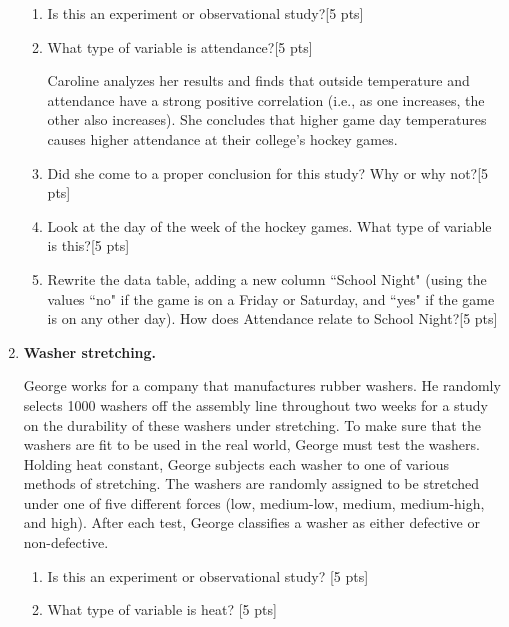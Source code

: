 \documentclass[11pt]{article}\usepackage[]{graphicx}\usepackage[]{color}
\begin{document}
\begin{enumerate}
    \begin{enumerate} 
    \item Is this an experiment or observational study?[5 pts]
    
    \item What type of variable is attendance?[5 pts]
    
    \vspace{1cm}
    
    Caroline analyzes her results and finds that
    outside temperature and attendance have a strong
    positive correlation (i.e., as one increases, the other also increases).
    She concludes that higher game day temperatures causes higher
    attendance at their college's hockey games.
    

    \item Did she come to a proper conclusion for this study? Why or why not?[5 pts]
    
    \item Look at the day of the week of the hockey games. What type of variable is this?[5 pts]
     
    \item 
    Rewrite the data table, adding a new column ``School Night" (using the values ``no" if the game is on a Friday or Saturday, and ``yes" if the game is on any other day).
    How does Attendance relate to School Night?[5 pts]
    
   
    \end{enumerate}
    
\item \textbf{Washer stretching.}
  
George works for a company that manufactures  rubber washers.  He randomly selects 1000  washers off the assembly line throughout two weeks for a study on the durability of these washers under   stretching.  To make sure that the washers  are fit to be used in the real world, George must test  the washers.  Holding heat constant,  George subjects each washer to one of various methods of  stretching.  The washers are randomly assigned to be stretched under one of five different forces (low, medium-low, medium, medium-high, and high). After each test, George classifies  a washer as either defective or non-defective. 
 
    \begin{enumerate}
    \item Is this an experiment or observational study? [5 pts]
    
    \item What type of variable is heat? [5 pts]
     

\end{enumerate}
\end{enumerate}
\end{document}
